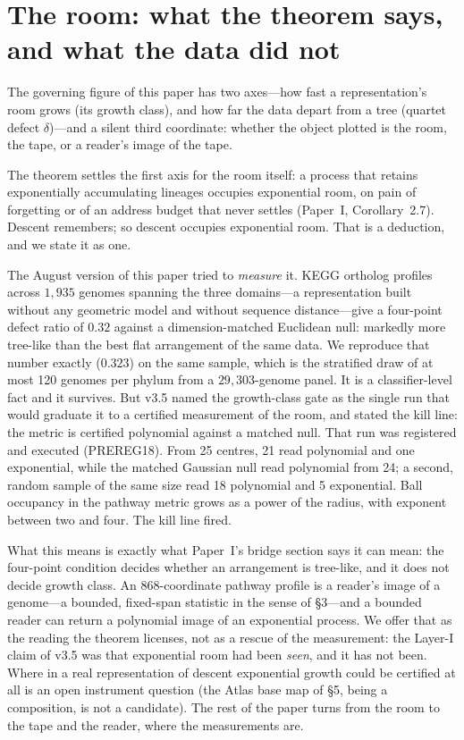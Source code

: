 \documentclass[11pt]{article}
\begin{document}
\section{The room: what the theorem says, and what the data did not}

The governing figure of this paper has two axes---how fast a representation's room grows (its growth class), and how far the data depart from a tree (quartet defect $\delta$)---and a silent third coordinate: whether the object plotted is the room, the tape, or a reader's image of the tape.

The theorem settles the first axis for the room itself: a process that retains exponentially accumulating lineages occupies exponential room, on pain of forgetting or of an address budget that never settles (Paper~I, Corollary~2.7). Descent remembers; so descent occupies exponential room. That is a deduction, and we state it as one.

The August version of this paper tried to \emph{measure} it. KEGG ortholog profiles across $1{,}935$ genomes spanning the three domains---a representation built without any geometric model and without sequence distance---give a four-point defect ratio of $0.32$ against a dimension-matched Euclidean null: markedly more tree-like than the best flat arrangement of the same data. We reproduce that number exactly ($0.323$) on the same sample, which is the stratified draw of at most 120 genomes per phylum from a $29{,}303$-genome panel. It is a classifier-level fact and it survives. But v3.5 named the growth-class gate as the single run that would graduate it to a certified measurement of the room, and stated the kill line: the metric is certified polynomial against a matched null. That run was registered and executed (PREREG18). From 25 centres, 21 read polynomial and one exponential, while the matched Gaussian null read polynomial from 24; a second, random sample of the same size read 18 polynomial and 5 exponential. Ball occupancy in the pathway metric grows as a power of the radius, with exponent between two and four. The kill line fired.

What this means is exactly what Paper~I's bridge section says it can mean: the four-point condition decides whether an arrangement is tree-like, and it does not decide growth class. An $868$-coordinate pathway profile is a reader's image of a genome---a bounded, fixed-span statistic in the sense of \S3---and a bounded reader can return a polynomial image of an exponential process. We offer that as the reading the theorem licenses, not as a rescue of the measurement: the Layer-I claim of v3.5 was that exponential room had been \emph{seen}, and it has not been. Where in a real representation of descent exponential growth could be certified at all is an open instrument question (the Atlas base map of \S5, being a composition, is not a candidate). The rest of the paper turns from the room to the tape and the reader, where the measurements are.
\end{document}
